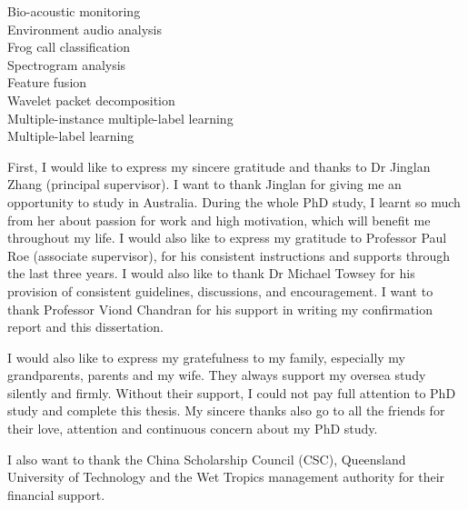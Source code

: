 \begin{keywords}
Bio-acoustic monitoring \\
Environment audio analysis \\
Frog call classification \\
Spectrogram analysis \\
Feature fusion \\
Wavelet packet decomposition \\
Multiple-instance multiple-label learning \\
Multiple-label learning \\
 
\end{keywords}

\begin{ack}
First, I would like to express my sincere gratitude and thanks to Dr Jinglan Zhang (principal supervisor). I want to thank Jinglan for giving me an opportunity to study in Australia. During the whole PhD study, I learnt so much from her about passion for work and high motivation, which will benefit me throughout my life. I would also like to express my gratitude to Professor Paul Roe (associate supervisor), for his consistent instructions and supports through the last three years. I would also like to thank Dr Michael Towsey for his provision of consistent guidelines, discussions, and encouragement. I want to thank Professor Viond Chandran for his support in writing my confirmation report and this dissertation. 

I would also like to express my gratefulness to my family, especially my grandparents, parents and my wife. They always support my oversea study silently and firmly. Without their support, I could not pay full attention to PhD study and complete this thesis. My sincere thanks also go to all the friends for their love, attention and continuous concern about my PhD study.

I also want to thank the China Scholarship Council (CSC), Queensland University of Technology and the Wet Tropics management authority for their financial support. 

\end{ack}





\afterpreface
